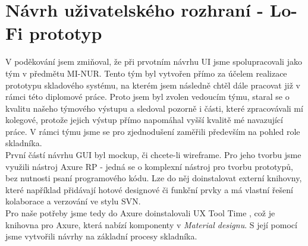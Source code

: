 \section{Návrh uživatelského rozhraní - Lo-Fi prototyp}

V poděkování jsem zmiňoval, že při prvotním návrhu UI jsme spolupracovali jako tým v předmětu MI-NUR. Tento tým byl vytvořen přímo za účelem realizace prototypu skladového systému, na kterém jsem následně chtěl dále pracovat již v rámci této diplomové práce. Proto jsem byl zvolen vedoucím týmu, staral se o kvalitu našeho týmového výstupu a sledoval pozorně i části, které zpracovávali mí kolegové, protože jejich výstup přímo napomáhal vyšší kvalitě mé navazující práce. V rámci týmu jsme se pro zjednodušení zaměřili především na pohled role skladníka.\\
První částí návrhu GUI byl mockup, či chcete-li wireframe. Pro jeho tvorbu jsme využili nástroj Axure RP \cite{axure} - jedná se o komplexní nástroj pro tvorbu prototypů, bez nutnosti psaní programového kódu. Lze do něj doinstalovat externí knihovny, které například přidávají hotové designové či funkční prvky a má vlastní řešení kolaborace a verzování ve stylu SVN.\\
Pro naše potřeby jsme tedy do Axure doinstalovali UX Tool Time \cite{uxtooltime}, což je knihovna pro Axure, která nabízí komponenty v \emph{Material designu}. S její pomocí jsme vytvořili návrhy na základní procesy skladníka.\\

